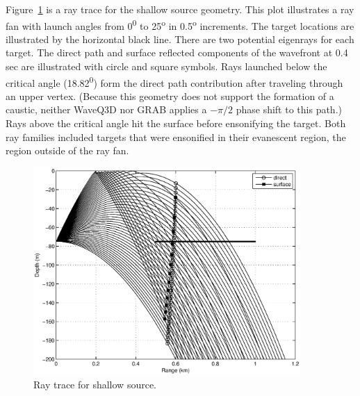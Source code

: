 \documentclass{ws-jca}
\begin{document}
Figure~\ref{fig:pedersen_shallow_raytrace} is a ray trace for the shallow
source geometry. This plot illustrates a ray fan with launch angles from
0\textsuperscript{0} to 25\textsuperscript{o} in 0.5\textsuperscript{o}
increments. The target locations are illustrated by the horizontal black
line. There are two potential eigenrays for each target. The direct path
and surface reflected components of the wavefront at 0.4 sec are
illustrated with circle and square symbols.  Rays launched below the critical
angle (18.82\textsuperscript{0}) form the direct path contribution after
traveling through an upper vertex. (Because this geometry does not support
the formation of a caustic, neither WaveQ3D nor GRAB applies a \(-\pi/2\)
phase shift to this path.) Rays above the critical angle hit the surface
before ensonifying the target. Both ray families included targets that were
ensonified in their evanescent region, the region outside of the ray fan.
\begin{figure}[th]
	\centerline{\includegraphics[width=4in]{pedersen_shallow_raytrace.eps}} 
	\vspace*{8pt}
	\caption{Ray trace for shallow source. 
	\label{fig:pedersen_shallow_raytrace}}
\end{figure}
\end{document}
